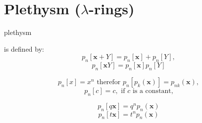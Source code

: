 \documentclass[12pt]{amsart}
\begin{document}
 \section{Plethysm ($\lambda$-rings)}
 \vspace{-10pt}
 \begin{mdframed}[linecolor=red!20,linewidth=3pt,innertopmargin=8pt]
	\begin{minipage}[t]{6cm}
		 \begin{bf}plethysm\end{bf} is defined by:
		\begin{equation} p_n[\bm{x}+Y]=p_n[\bm{x}]+p_n[Y],
		\end{equation}
		\begin{equation}p_n[\bm{x}Y]=p_n[\bm{x}]p_n[Y]
		\end{equation}
	\end{minipage}
	\begin{minipage}[t]{9cm}
		\begin{bf}\end{bf}
		\begin{equation}p_n[x]=x^n\text{ therefor } p_n[p_k(\bm{x})]=p_{nk}(\bm{x}),
		\end{equation}
		\begin{equation}p_n[c]=c, \text{ if } c \text{ is a constant,}
		\end{equation}
	\end{minipage}
	\begin{minipage}[t]{4cm}
		\begin{bf}\end{bf}
		\begin{equation*}p_n[q\bm{x}]=q^np_n(\bm{x})\end{equation*}
		\begin{equation*}p_n[t\bm{x}]=t^np_n(\bm{x})\end{equation*}
	\end{minipage}


\end{mdframed}

\vspace{-10pt}
\end{document}
